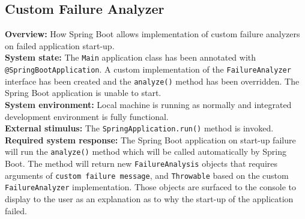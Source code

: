 \subsection*{Custom Failure Analyzer}

\textbf{Overview:} How Spring Boot allows implementation of custom failure analyzers on failed application start-up.\\

\textbf{System state:} The \texttt{Main} application class has been annotated with \texttt{@SpringBootApplication}. A custom implementation of the \texttt{FailureAnalyzer} interface has been created and the \texttt{analyze()} method has been overridden. The Spring Boot application is unable to start. \\

\textbf{System environment:} Local machine is running as normally and integrated development environment is fully functional. \\

\textbf{External stimulus:} The \texttt{SpringApplication.run()} method is invoked. \\

\textbf{Required system response:} The Spring Boot application on start-up failure will run the \texttt{analyze()} method which will be called automatically by Spring Boot. The method will return new \texttt{FailureAnalysis} objects that requires arguments of \texttt{custom failure message}, and \texttt{Throwable} based on the custom \texttt{FailureAnalyzer} implementation. Those objects are surfaced to the console to display to the user as an explanation as to why the start-up of the application failed.